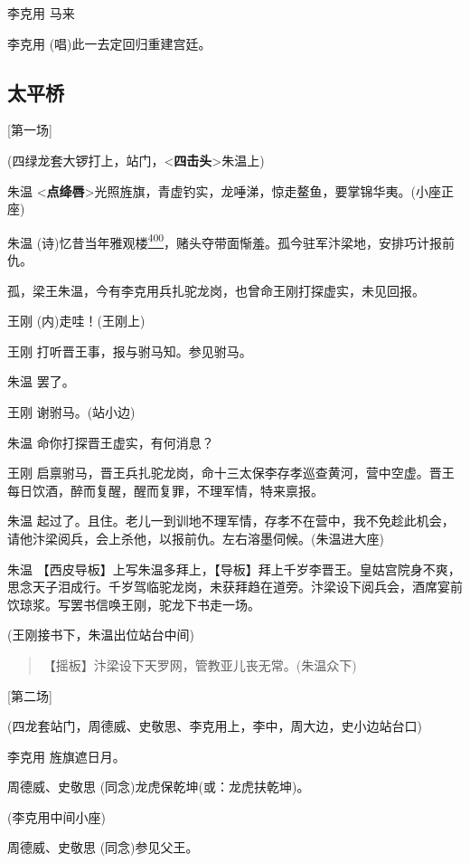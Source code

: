 李克用 马来

李克用 (唱)此一去定回归重建宫廷。

\newpage
\hypertarget{ux592aux5e73ux6865}{%
\subsection{太平桥}\label{ux592aux5e73ux6865}}

{[}第一场{]}

(四绿龙套大锣打上，站门，\textless{}\textbf{四击头}\textgreater{}朱温上)

朱温
\textless{}\textbf{点绛唇}\textgreater{}光照旌旗，青虚钓实，龙唾涕，惊走鳌鱼，要掌锦华夷。(小座正座)

朱温
(诗)忆昔当年雅观楼\protect\hyperlink{fn400}{\textsuperscript{400}}，赌头夺带面惭羞。孤今驻军汴梁地，安排巧计报前仇。

孤，梁王朱温，今有李克用兵扎驼龙岗，也曾命王刚打探虚实，未见回报。

王刚 (内)走哇！(王刚上)

王刚 打听晋王事，报与驸马知。参见驸马。

朱温 罢了。

王刚 谢驸马。(站小边)

朱温 命你打探晋王虚实，有何消息？

王刚
启禀驸马，晋王兵扎驼龙岗，命十三太保李存孝巡查黄河，营中空虚。晋王每日饮酒，醉而复醒，醒而复罪，不理军情，特来禀报。

朱温
起过了。且住。老儿一到训地不理军情，存孝不在营中，我不免趁此机会，请他汴梁阅兵，会上杀他，以报前仇。左右溶墨伺候。(朱温进大座)

朱温
【西皮导板】上写朱温多拜上，【导板】拜上千岁李晋王。皇姑宫院身不爽，思念天子泪成行。千岁驾临驼龙岗，未获拜趋在道旁。汴梁设下阅兵会，酒席宴前饮琼浆。写罢书信唤王刚，驼龙下书走一场。

(王刚接书下，朱温出位站台中间)

\begin{quote}
【摇板】汴梁设下天罗网，管教亚儿丧无常。(朱温众下)
\end{quote}

{[}第二场{]}

(四龙套站门，周德威、史敬思、李克用上，李中，周大边，史小边站台口)

李克用 旌旗遮日月。

周德威、史敬思 (同念)龙虎保乾坤(或：龙虎扶乾坤)。

(李克用中间小座)

周德威、史敬思 (同念)参见父王。

